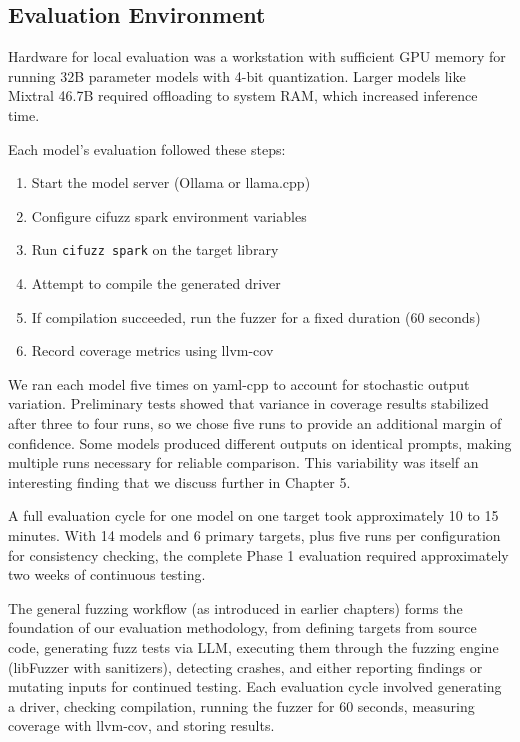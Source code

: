 \subsection{Evaluation Environment}

Hardware for local evaluation was a workstation with sufficient GPU memory for running 32B parameter models with 4-bit quantization. Larger models like Mixtral 46.7B required offloading to system RAM, which increased inference time.

Each model's evaluation followed these steps:

\begin{enumerate}
    \item Start the model server (Ollama or llama.cpp)
    \item Configure cifuzz spark environment variables
    \item Run \texttt{cifuzz spark} on the target library
    \item Attempt to compile the generated driver
    \item If compilation succeeded, run the fuzzer for a fixed duration (60 seconds)
    \item Record coverage metrics using llvm-cov
\end{enumerate}

We ran each model five times on yaml-cpp to account for stochastic output variation. Preliminary tests showed that variance in coverage results stabilized after three to four runs, so we chose five runs to provide an additional margin of confidence. Some models produced different outputs on identical prompts, making multiple runs necessary for reliable comparison. This variability was itself an interesting finding that we discuss further in Chapter 5.

A full evaluation cycle for one model on one target took approximately 10 to 15 minutes. With 14 models and 6 primary targets, plus five runs per configuration for consistency checking, the complete Phase 1 evaluation required approximately two weeks of continuous testing.

The general fuzzing workflow (as introduced in earlier chapters) forms the foundation of our evaluation methodology, from defining targets from source code, generating fuzz tests via LLM, executing them through the fuzzing engine (libFuzzer with sanitizers), detecting crashes, and either reporting findings or mutating inputs for continued testing. Each evaluation cycle involved generating a driver, checking compilation, running the fuzzer for 60 seconds, measuring coverage with llvm-cov, and storing results.


